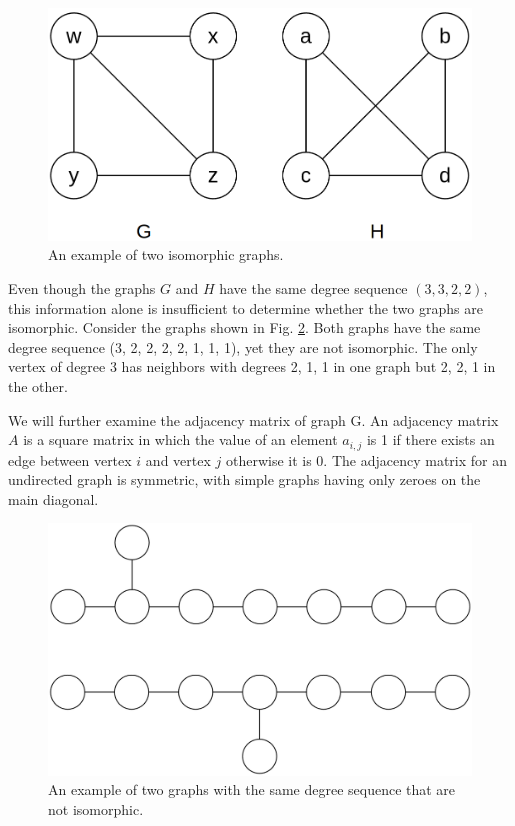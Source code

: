 \begin{figure}[H]
\begin{center}
\includegraphics[scale=0.3,keepaspectratio]{images/isomorphism_example.png}
\end{center}
\caption{An example of two isomorphic graphs.}
\label{fig:graph_isomorphism}
\end{figure}

Even though the graphs $G$ and $H$ have the same degree sequence $(3, 3, 2, 2)$, this information alone is insufficient to determine whether the two graphs are isomorphic. Consider the graphs shown in Fig. \ref{fig:non_isomorphism}. Both graphs have the same degree sequence (3, 2, 2, 2, 2, 1, 1, 1), yet they are not isomorphic. The only vertex of degree 3 has neighbors with degrees 2, 1, 1 in one graph but 2, 2, 1 in the other.

We will further examine the adjacency matrix of graph G. An adjacency matrix $A$ is a square matrix in which the value of an element $a_{i, j}$ is 1 if there exists an edge between vertex $i$ and vertex $j$ otherwise it is 0. The adjacency matrix for an undirected graph is symmetric, with simple graphs having only zeroes on the main diagonal.

\begin{figure}[H]
\begin{center}
\includegraphics[scale=0.2,keepaspectratio]{images/non_isomorphism_example.png}
\end{center}
\caption{An example of two graphs with the same degree sequence that are not isomorphic.}
\label{fig:non_isomorphism}
\end{figure}

